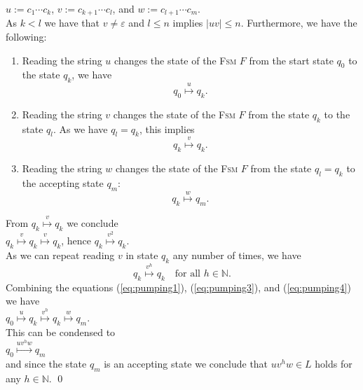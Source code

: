 $u := c_1 \cdots c_k$, \quad $v := c_{k+1} \cdots c_l$, \quad and \quad $w := c_{l+1} \cdots c_{m}$.
\\[0.2cm]
As $k < l$ we have that $v \not= \varepsilon$ and $l \leq n$ implies $|uv| \leq n$.
Furthermore, we have the following:
\begin{enumerate}
\item Reading the string $u$ changes the state of the \textsc{Fsm} $F$ from the start state $q_0$ to
      the state $q_k$, we have
      \begin{equation}
        \label{eq:pumping1}
        q_0 \stackrel{u}{\longmapsto} q_k.    
      \end{equation}
\item Reading the string $v$ changes the state of the \textsc{Fsm} $F$ from the state $q_k$ to the
      state $q_l$.  As we have $q_l = q_k$, this implies
      \begin{equation}
        \label{eq:pumping2}
      q_k \stackrel{v}{\longmapsto} q_k.        
      \end{equation}
\item Reading the string $w$ changes the state of the \textsc{Fsm} $F$ from the state  $q_l = q_k$
      to the accepting state $q_m$:
      \begin{equation}
        \label{eq:pumping3}
        q_k \stackrel{w}{\longmapsto} q_m.        
      \end{equation}
\end{enumerate}
From $q_k \stackrel{v}{\longmapsto} q_k$ we conclude
\\[0.2cm]
\hspace*{1.3cm}
$q_k \stackrel{v}{\longmapsto} q_k \stackrel{v}{\longmapsto} q_k$, \quad hence \quad $q_k \stackrel{v^2}{\longmapsto} q_k$.
\\[0.2cm]
As we can repeat reading $v$ in state $q_k$ any number of times, we have
\begin{equation}
  \label{eq:pumping4}
  q_k \stackrel{v^h}{\longmapsto} q_k  \quad \mbox{for all $h \in \mathbb{N}$.}
\end{equation}
Combining the equations (\ref{eq:pumping1}), (\ref{eq:pumping3}), and (\ref{eq:pumping4})  we have
\\[0.2cm]
\hspace*{1.3cm}
$q_0 \stackrel{u}{\longmapsto} q_k \stackrel{v^h}{\longmapsto} q_k \stackrel{w}{\longmapsto} q_m$.
\\[0.2cm]
This can be condensed to
\\[0.2cm]
\hspace*{1.3cm}
$q_0 \stackrel{uv^hw}{\longmapsto} q_m$
\\[0.2cm]
and since the state $q_m$ is an accepting state we conclude that $uv^hw \in L$ holds for any $h \in \mathbb{N}$. \qed



